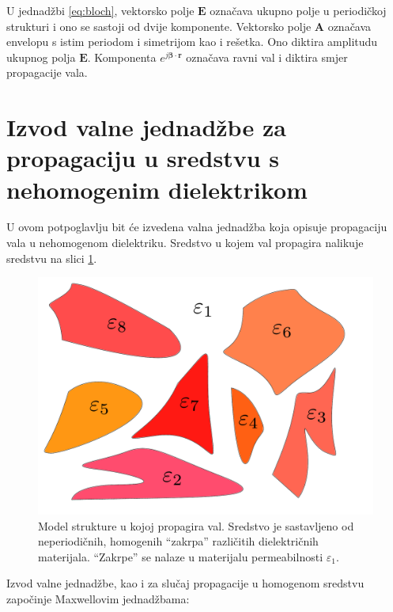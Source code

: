 \documentclass[utf8, seminar]{fer}
\begin{document}
U jednadžbi \ref{eq:bloch}, vektorsko polje $\mathbf{E}$ označava ukupno polje
u periodičkoj strukturi i ono se sastoji od dvije komponente. Vektorsko polje
$\mathbf{A}$ označava envelopu s istim periodom i simetrijom kao i rešetka.
Ono diktira amplitudu ukupnog polja $\mathbf{E}$.
Komponenta ${e^{j \mathbf{\beta} \cdot \mathbf{r}}}$ označava ravni val i diktira
smjer propagacije vala.




\section{Izvod valne jednadžbe za propagaciju u sredstvu s nehomogenim dielektrikom}

U ovom potpoglavlju bit će izvedena valna jednadžba koja opisuje propagaciju
vala u nehomogenom dielektriku. Sredstvo u kojem val propagira nalikuje sredstvu
na slici \ref{fig:structure}.

\begin{figure}[ht]
	\centering
	\includegraphics[width = 1.0\linewidth]{./images/structure-model.pdf}
	\caption{Model strukture u kojoj propagira val. Sredstvo je sastavljeno od
	neperiodičnih, homogenih ``zakrpa'' različitih dielektričnih materijala.
	``Zakrpe'' se nalaze u materijalu permeabilnosti $\varepsilon_1$.}
	\label{fig:structure}
\end{figure}

\FloatBarrier

Izvod valne jednadžbe, kao i za slučaj propagacije u homogenom sredstvu započinje
Maxwellovim jednadžbama:
\end{document}
